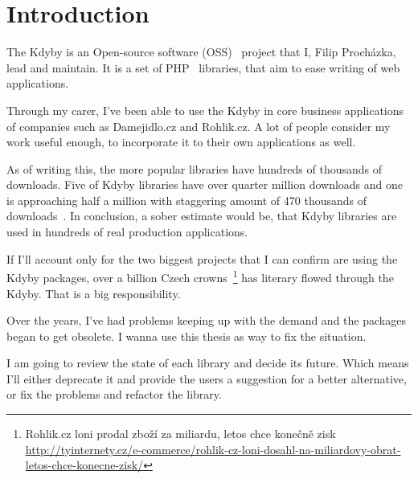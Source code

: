 \chapter{Introduction}

The Kdyby is an Open-source software (OSS)~\cite{wiki:oss} project that I, Filip Procházka, lead and maintain. It is a set of PHP~\cite{wiki:php} libraries, that aim to ease writing of web applications.

Through my carer, I've been able to use the Kdyby in core business applications of companies such as Damejidlo.cz and Rohlik.cz. A lot of people consider my work useful enough, to incorporate it to their own applications as well.

As of writing this, the more popular libraries have hundreds of thousands of downloads. Five of Kdyby libraries have over quarter million downloads and one is approaching half a million with staggering amount of 470 thousands of downloads~\cite{packagist:kdyby}. In conclusion, a sober estimate would be, that Kdyby libraries are used in hundreds of real production applications.

If I'll account only for the two biggest projects that I can confirm are using the Kdyby packages, over a billion Czech crowns~\footnote{Rohlik.cz loni prodal zboží za miliardu, letos chce konečně zisk \\\url{http://tyinternety.cz/e-commerce/rohlik-cz-loni-dosahl-na-miliardovy-obrat-letos-chce-konecne-zisk/}} has literary flowed through the Kdyby. That is a big responsibility.

Over the years, I've had problems keeping up with the demand and the packages began to get obsolete. I wanna use this thesis as way to fix the situation.

I am going to review the state of each library and decide its future. Which means I'll either deprecate it and provide the users a suggestion for a better alternative, or fix the problems and refactor the library.
